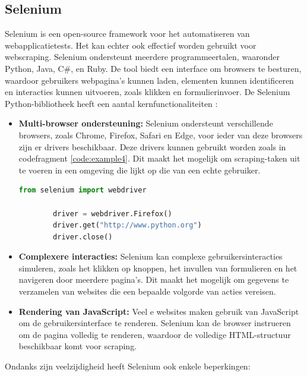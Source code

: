 \subsection{Selenium}
Selenium is een open-source framework voor het automatiseren van webapplicatietests. Het kan echter ook effectief worden gebruikt voor webscraping. Selenium ondersteunt meerdere programmeertalen, waaronder Python, Java, C#, en Ruby. De tool biedt een interface om browsers te besturen, waardoor gebruikers webpagina's kunnen laden, elementen kunnen identificeren en interacties kunnen uitvoeren, zoals klikken en formulierinvoer. De Selenium Python-bibliotheek heeft een aantal kernfunctionaliteiten \autocite{Muthukadan2011}:

\begin{itemize}
    \item \textbf{Multi-browser ondersteuning:} Selenium ondersteunt verschillende browsers, zoals Chrome, Firefox, Safari en Edge, voor ieder van deze browsers zijn er drivers beschikbaar. Deze drivers kunnen gebruikt worden zoals in codefragment \ref{code:example4}. Dit maakt het mogelijk om scraping-taken uit te voeren in een omgeving die lijkt op die van een echte gebruiker.

    \begin{lstlisting}[language=Python, caption={voorbeeld Selenium driver}, captionpos=b, label=code:example4]
        from selenium import webdriver

        driver = webdriver.Firefox()
        driver.get("http://www.python.org")
        driver.close()
    \end{lstlisting}

    \item \textbf{Complexere interacties:} Selenium kan complexe gebruikersinteracties simuleren, zoals het klikken op knoppen, het invullen van formulieren en het navigeren door meerdere pagina's. Dit maakt het mogelijk om gegevens te verzamelen van websites die een bepaalde volgorde van acties vereisen.

    \item \textbf{Rendering van JavaScript:} Veel e websites maken gebruik van JavaScript om de gebruikersinterface te renderen. Selenium kan de browser instrueren om de pagina volledig te renderen, waardoor de volledige HTML-structuur beschikbaar komt voor scraping.

\end{itemize}

Ondanks zijn veelzijdigheid heeft Selenium ook enkele beperkingen:

